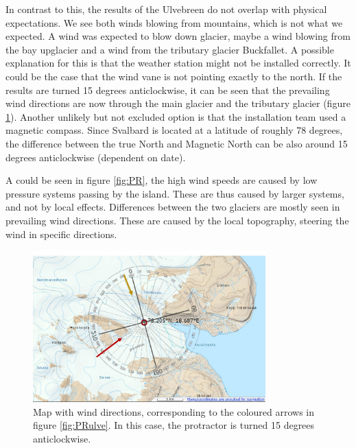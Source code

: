 \documentclass[11pt]{report}
\begin{document}
In contrast to this, the results of the Ulvebreen do not overlap with physical expectations. We see both winds blowing from mountains, which is not what we expected. A wind was expected to blow down glacier, maybe a wind blowing from the bay upglacier and a wind from the tributary glacier Buckfallet. A possible explanation for this is that the weather station might not be installed correctly. It could be the case that the wind vane is not pointing exactly to the north. If the results are turned 15 degrees anticlockwise, it can be seen that the prevailing wind directions are now through the main glacier and the tributary glacier (figure \ref{fig:trose15}). Another unlikely but not excluded option is that the installation team used a magnetic compass. Since Svalbard is located at a latitude of roughly 78 degrees, the difference between the true North and Magnetic North can be also around 15 degrees anticlockwise (dependent on date).

A could be seen in figure \ref{fig:PR}, the high wind speeds are caused by low pressure systems passing by the island. These are thus caused by larger systems, and not by local effects. Differences between the two glaciers are mostly seen in prevailing wind directions. These are caused by the local topography, steering the wind in specific directions.

\begin{figure}[H]
\includegraphics[scale=1, width=0.8\textwidth]{ulve-WS-WD-rose-15.jpg}
\caption{Map \cite{NPI} with wind directions, corresponding to the coloured arrows in figure \ref{fig:PRulve}. In this case, the protractor is turned 15 degrees anticlockwise.}
\label{fig:trose15}
\end{figure}
\end{document}
